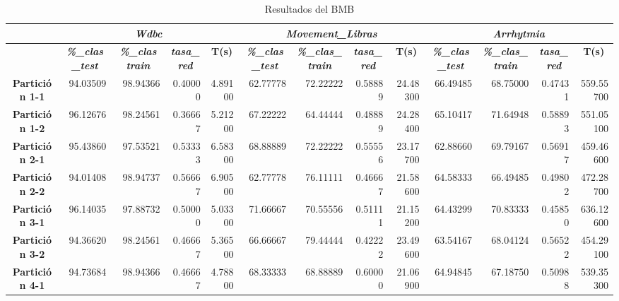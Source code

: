 \documentclass[a4paper,11pt]{article}
\begin{document}
  \begin{table}[H]
  \caption{Resultados del BMB}
  \begin{adjustbox}{width=1.1\textwidth}
  \begin{tabular}{|c|r|r|r|r|r|r|r|r|r|r|r|r|}
  \hline
  \multicolumn{1}{|l|}{} & \multicolumn{ 4}{c|}{\textbf{\textit{Wdbc}}} & \multicolumn{ 4}{c|}{\textbf{\textit{Movement\_Libras}}} & \multicolumn{ 4}{c|}{\textbf{\textit{Arrhytmia}}} \\ \hline
  \multicolumn{1}{|l|}{} & \multicolumn{1}{c|}{\textbf{\textit{\%\_clas\_test}}} & \multicolumn{1}{c|}{\textbf{\textit{\%\_clas train}}} & \multicolumn{1}{c|}{\textbf{\textit{tasa\_red}}} & \multicolumn{1}{c|}{\textbf{T(s)}} & \multicolumn{1}{c|}{\textbf{\textit{\%\_clas\_test}}} & \multicolumn{1}{c|}{\textbf{\textit{\%\_clas\_train}}} & \multicolumn{1}{c|}{\textbf{\textit{tasa\_red}}} & \multicolumn{1}{c|}{\textbf{T(s)}} & \multicolumn{1}{c|}{\textbf{\textit{\%\_clas\_test}}} & \multicolumn{1}{c|}{\textbf{\textit{\%\_clas\_train}}} & \multicolumn{1}{c|}{\textbf{\textit{tasa\_red}}} & \multicolumn{1}{c|}{\textbf{T(s)}} \\ \hline
  \textbf{Partición 1-1} & 94.03509 & 98.94366 & 0.40000 & 4.89100 & 62.77778 & 72.22222 & 0.58889 & 24.48300 & 66.49485 & 68.75000 & 0.47431 & 559.55700 \\ \hline
  \textbf{Partición 1-2} & 96.12676 & 98.24561 & 0.36667 & 5.21200 & 67.22222 & 64.44444 & 0.48889 & 24.28400 & 65.10417 & 71.64948 & 0.58893 & 551.05100 \\ \hline
  \textbf{Partición 2-1} & 95.43860 & 97.53521 & 0.53333 & 6.58300 & 68.88889 & 72.22222 & 0.55556 & 23.17700 & 62.88660 & 69.79167 & 0.56917 & 459.46600 \\ \hline
  \textbf{Partición 2-2} & 94.01408 & 98.94737 & 0.56667 & 6.90500 & 62.77778 & 76.11111 & 0.46667 & 21.58600 & 64.58333 & 66.49485 & 0.49802 & 472.28700 \\ \hline
  \textbf{Partición 3-1} & 96.14035 & 97.88732 & 0.50000 & 5.03300 & 71.66667 & 70.55556 & 0.51111 & 21.15200 & 64.43299 & 70.83333 & 0.45850 & 636.12600 \\ \hline
  \textbf{Partición 3-2} & 94.36620 & 98.24561 & 0.46667 & 5.36500 & 66.66667 & 79.44444 & 0.42222 & 23.49600 & 63.54167 & 68.04124 & 0.56522 & 454.29100 \\ \hline
  \textbf{Partición 4-1} & 94.73684 & 98.94366 & 0.46667 & 4.78800 & 68.33333 & 68.88889 & 0.60000 & 21.06900 & 64.94845 & 67.18750 & 0.50988 & 539.35300 \\ \hline

\end{tabular}
\end{adjustbox}
\end{table}
\end{document}
